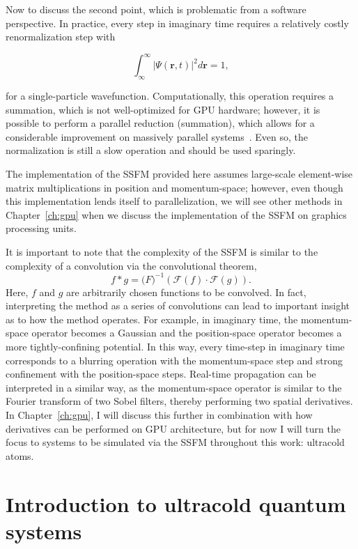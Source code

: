 Now to discuss the second point, which is problematic from a software perspective.
In practice, every step in imaginary time requires a relatively costly renormalization step with

\begin{equation}
    \label{eqn:norm}
    \int_\infty^\infty |\Psi(\mathbf{r},t)|^2 d\mathbf{r} = 1,
\end{equation}

\noindent for a single-particle wavefunction.
Computationally, this operation requires a summation, which is not well-optimized for GPU hardware; however, it is possible to perform a parallel reduction (summation), which allows for a considerable improvement on massively parallel systems~\cite{harris2007}.
Even so, the normalization is still a slow operation and should be used sparingly.

The implementation of the SSFM provided here assumes large-scale element-wise matrix multiplications in position and momentum-space; however, even though this implementation lends itself to parallelization, we will see other methods in Chapter~\ref{ch:gpu} when we discuss the implementation of the SSFM on graphics processing units.

It is important to note that the complexity of the SSFM is similar to the complexity of a convolution via the convolutional theorem,
\begin{equation}
f * g = \mathcal(F)^{-1}\left(\mathcal{F}(f)\cdot\mathcal{F}(g)\right).
\end{equation}
Here, $f$ and $g$ are arbitrarily chosen functions to be convolved.
In fact, interpreting the method as a series of convolutions can lead to important insight as to how the method operates.
For example, in imaginary time, the momentum-space operator becomes a Gaussian and the position-space operator becomes a more tightly-confining potential.
In this way, every time-step in imaginary time corresponds to a blurring operation with the momentum-space step and strong confinement with the position-space steps.
Real-time propagation can be interpreted in a similar way, as the momentum-space operator is similar to the Fourier transform of two Sobel filters, thereby performing two spatial derivatives.
In Chapter~\ref{ch:gpu}, I will discuss this further in combination with how derivatives can be performed on GPU architecture, but for now
I will turn the focus to systems to be simulated via the SSFM throughout this work: ultracold atoms.

\section{Introduction to ultracold quantum systems}
\label{sec:intro}

